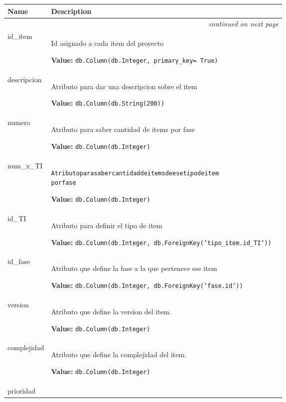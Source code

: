     \vspace{-1cm}
\hspace{\varindent}\begin{longtable}{|p{\varnamewidth}|p{\vardescrwidth}|l}
\cline{1-2}
\cline{1-2} \centering \textbf{Name} & \centering \textbf{Description}& \\
\cline{1-2}
\endhead\cline{1-2}\multicolumn{3}{r}{\small\textit{continued on next page}}\\\endfoot\cline{1-2}
\endlastfoot\raggedright i\-d\-\_\-i\-t\-e\-m\- & \raggedright Id asignado a cada item del proyecto

\textbf{Value:} 
{\tt db.Column(db.Integer, primary\_key= True)}&\\
\cline{1-2}
\raggedright d\-e\-s\-c\-r\-i\-p\-c\-i\-o\-n\- & \raggedright Atributo para dar una descripcion sobre el item

\textbf{Value:} 
{\tt db.Column(db.String(200))}&\\
\cline{1-2}
\raggedright n\-u\-m\-e\-r\-o\- & \raggedright Atributo para saber cantidad de items por fase

\textbf{Value:} 
{\tt db.Column(db.Integer)}&\\
\cline{1-2}
\raggedright n\-u\-m\-\_\-x\-\_\-T\-I\- & \raggedright \begin{alltt}

Atributo para saber cantidad de items de ese tipo de item
 por fase
\end{alltt}

\textbf{Value:} 
{\tt db.Column(db.Integer)}&\\
\cline{1-2}
\raggedright i\-d\-\_\-T\-I\- & \raggedright Atributo para definir el tipo de item

\textbf{Value:} 
{\tt db.Column(db.Integer, db.ForeignKey('tipo\_item.id\_TI'))}&\\
\cline{1-2}
\raggedright i\-d\-\_\-f\-a\-s\-e\- & \raggedright Atributo que define la fase a la que pertenece ese item

\textbf{Value:} 
{\tt db.Column(db.Integer, db.ForeignKey('fase.id'))}&\\
\cline{1-2}
\raggedright v\-e\-r\-s\-i\-o\-n\- & \raggedright Atributo que define la version del item.

\textbf{Value:} 
{\tt db.Column(db.Integer)}&\\
\cline{1-2}
\raggedright c\-o\-m\-p\-l\-e\-j\-i\-d\-a\-d\- & \raggedright Atributo que define la complejidad del item.

\textbf{Value:} 
{\tt db.Column(db.Integer)}&\\
\cline{1-2}
\raggedright p\-r\-i\-o\-r\-i\-d\-a\-d\- & \raggedright \begin{alltt}


\end{alltt}
\end{longtable}
